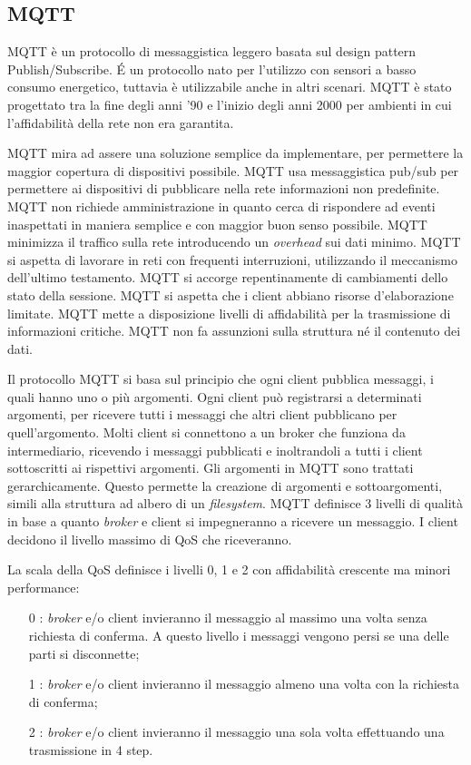 \subsection{MQTT}
MQTT è un protocollo di messaggistica leggero basata sul design pattern Publish/Subscribe.
É un protocollo nato per l'utilizzo con sensori a basso consumo energetico, tuttavia è utilizzabile anche in altri scenari.
MQTT è stato progettato tra la fine degli anni '90 e l'inizio degli anni 2000 per ambienti in cui l'affidabilità della rete non era garantita.

MQTT mira ad assere una soluzione semplice da implementare, per permettere la maggior copertura di dispositivi possibile.
MQTT usa messaggistica pub/sub per permettere ai dispositivi di pubblicare nella rete informazioni non predefinite.
MQTT non richiede amministrazione in quanto cerca di rispondere ad eventi inaspettati in maniera semplice e con maggior buon senso possibile.
MQTT minimizza il traffico sulla rete introducendo un \emph{overhead} sui dati minimo.
MQTT si aspetta di lavorare in reti con frequenti interruzioni, utilizzando il meccanismo dell'ultimo testamento.
MQTT si accorge repentinamente di cambiamenti dello stato della sessione.
MQTT si aspetta che i client abbiano risorse d'elaborazione limitate.
MQTT mette a disposizione livelli di affidabilità per la trasmissione di informazioni critiche.
MQTT non fa assunzioni sulla struttura né il contenuto dei dati.

Il protocollo MQTT si basa sul principio che ogni client pubblica messaggi, i quali hanno uno o più argomenti.
Ogni client può registrarsi a determinati argomenti, per ricevere tutti i messaggi che altri client pubblicano per quell'argomento. Molti client si connettono a un  \gls{broker} che funziona da intermediario, ricevendo i messaggi pubblicati e inoltrandoli a tutti i client sottoscritti ai rispettivi argomenti.
Gli argomenti in MQTT sono trattati gerarchicamente. Questo permette la creazione di argomenti e sottoargomenti, simili alla struttura ad albero di un \emph{filesystem}.
MQTT definisce 3 livelli di qualità in base a quanto \emph{broker} e client si impegneranno a ricevere un messaggio.
I client decidono il livello massimo di QoS che riceveranno.

La scala della QoS definisce i livelli 0, 1 e 2 con affidabilità crescente ma minori performance:
\begin{itemize}
	\item [0]: \emph{broker} e/o client invieranno il messaggio al massimo una volta senza richiesta di conferma. A questo livello i messaggi vengono persi se una delle parti si disconnette;
	\item [1]: \emph{broker} e/o client invieranno il messaggio almeno una volta con la richiesta di conferma;
	\item [2]: \emph{broker} e/o client invieranno il messaggio una sola volta effettuando una trasmissione in 4 step.
\end{itemize}

